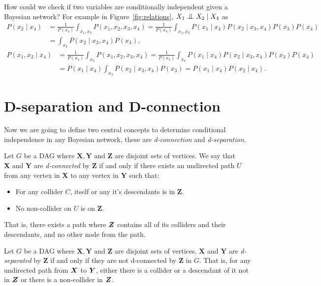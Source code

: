 How could we check if two variables are conditionally independent given a
Bayesian network? For example in Figure~\ref{fig:relations}, \(X_1 \bigCI
X_2 \mid X_4\) as
\[
  \begin{aligned}
    P(x_2 \mid x_4) &= \frac{1}{P(x_4)}\int_{x_1,x_3}P(x_1, x_2, x_3, x_4)
    = \frac{1}{P(x_4)}\int_{x_1,x_3}P(x_1 \mid x_4)P(x_2\mid x_3,x_4)P(x_3)P(x_4)\\
    &= \int_{x_3}P(x_2\mid x_3, x_4)P(x_3),
  \end{aligned}
\]
\[
  \begin{aligned}
    P(x_1, x_2 \mid x_4) &= \frac{1}{P(x_4)}\int_{x_3}P(x_1, x_2, x_3, x_4)
    = \frac{1}{P(x_4)}\int_{x_3}P(x_1\mid x_4)P(x_2\mid x_3,x_4)P(x_3)P(x_4)\\
    &= P(x_1\mid x_4)\int_{x_3}P(x_2\mid x_3, x_4)P(x_3) = P(x_1\mid x_4)P(x_2\mid x_4).
  \end{aligned}
\]

\section{D-separation and D-connection}

Now we are going to define two central concepts to determine conditional
independence in any Bayesian network, these are \emph{d-connection} and \emph{d-separation}.

\begin{definition}
  Let \(G\) be a DAG where \(\bm{X}, \bm{Y} \text{ and } \bm{Z}\)
  are disjoint sets of vertices. We say that \(\bm{X} \text{ and
  } \bm{Y}\) are \emph{d-connected} by \(\bm{Z}\) if and only if there
  exists an undirected path \(U\) from any vertex in \(\bm{X}\) to any
  vertex in \(\bm{Y}\) such that:
  \begin{itemize}
    \item For any  collider \(C\), itself or any it's descendants is in \(\bm{Z}\).
    \item No non-collider on \(U\) is on \(\bm{Z}\).
  \end{itemize}
  That is, there exists a path where \(\bm{Z}\) contains all of its colliders and their descendants, and no other node from the path.
\end{definition}

\begin{definition}
  Let \(G\) be a DAG where \(\bm{X}, \bm{Y} \text{ and } \bm{Z}\) are disjoint sets of vertices. \(\bm{X}\) and \(\bm{Y}\) are \emph{d-separated} by \(\bm{Z}\) if and only if they are not d-connected by \(\bm{Z}\) in \(G\). That is, for any undirected path from \(\bm{X}\) to \(\bm{Y}\), either there is a collider or a descendant of it not in \(\bm{Z}\) or there is a non-collider in  \(\bm{Z}\).
\end{definition}

